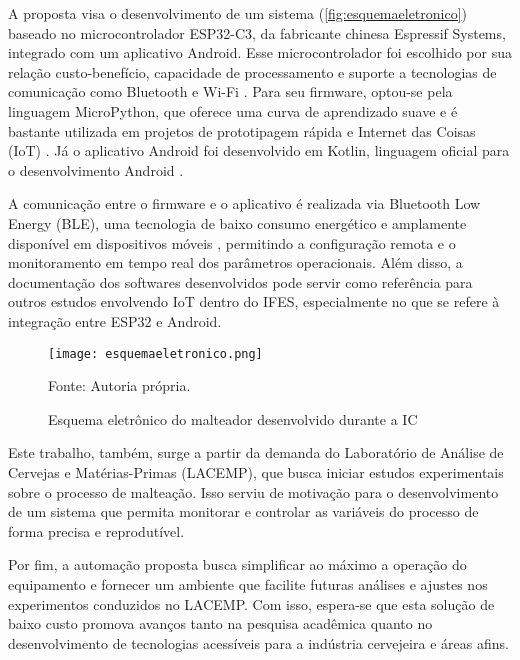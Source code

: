 A proposta visa o desenvolvimento de um sistema (\autoref{fig:esquemaeletronico}) baseado no microcontrolador ESP32-C3, da fabricante chinesa Espressif Systems, integrado com um aplicativo Android. Esse microcontrolador foi escolhido por sua relação custo-benefício, capacidade de processamento e suporte a tecnologias de comunicação como Bluetooth e Wi-Fi \cite{rodrigues2021controle, santos2019sistema}. Para seu firmware, optou-se pela linguagem MicroPython, que oferece uma curva de aprendizado suave e é bastante utilizada em projetos de prototipagem rápida e Internet das Coisas (IoT) \cite{TOLLERVEY2017, brito2020automaccao}. Já o aplicativo Android foi desenvolvido em Kotlin, linguagem oficial para o desenvolvimento Android \cite{sempreupdate_kotlin_2020}.

A comunicação entre o firmware e o aplicativo é realizada via Bluetooth Low Energy (BLE), uma tecnologia de baixo consumo energético e amplamente disponível em dispositivos móveis \cite{heydon2012bluetooth}, permitindo a configuração remota e o monitoramento em tempo real dos parâmetros operacionais. Além disso, a documentação dos softwares desenvolvidos pode servir como referência para outros estudos envolvendo IoT dentro do IFES, especialmente no que se refere à integração entre ESP32 e Android.

\begin{figure}[ht]
    \centering
    \caption{Esquema eletrônico do malteador desenvolvido durante a IC}
    \label{fig:esquemaeletronico}
    \texttt{[image: esquemaeletronico.png]}

    {\centering\footnotesize Fonte: Autoria própria.\par}
\end{figure}

Este trabalho, também, surge a partir da demanda do Laboratório de Análise de Cervejas e Matérias-Primas (LACEMP), que busca iniciar estudos experimentais sobre o processo de malteação. Isso serviu de motivação para o desenvolvimento de um sistema que permita monitorar e controlar as variáveis do processo de forma precisa e reprodutível. 

Por fim, a automação proposta busca simplificar ao máximo a operação do equipamento e fornecer um ambiente que facilite futuras análises e ajustes nos experimentos conduzidos no LACEMP. Com isso, espera-se que esta solução de baixo custo promova avanços tanto na pesquisa acadêmica quanto no desenvolvimento de tecnologias acessíveis para a indústria cervejeira e áreas afins.